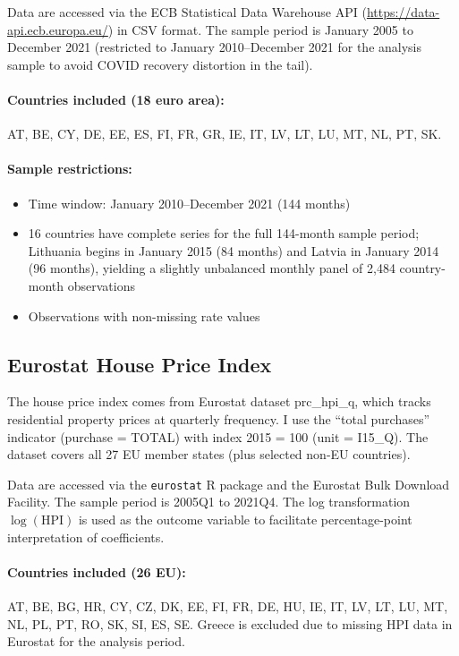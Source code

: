 \documentclass[12pt]{article}
\begin{document}
Data are accessed via the ECB Statistical Data Warehouse API (\url{https://data-api.ecb.europa.eu/}) in CSV format. The sample period is January 2005 to December 2021 (restricted to January 2010--December 2021 for the analysis sample to avoid COVID recovery distortion in the tail).

\paragraph{Countries included (18 euro area):} AT, BE, CY, DE, EE, ES, FI, FR, GR, IE, IT, LV, LT, LU, MT, NL, PT, SK.

\paragraph{Sample restrictions:}
\begin{itemize}
\item Time window: January 2010--December 2021 (144 months)
\item 16 countries have complete series for the full 144-month sample period; Lithuania begins in January 2015 (84 months) and Latvia in January 2014 (96 months), yielding a slightly unbalanced monthly panel of 2,484 country-month observations
\item Observations with non-missing rate values
\end{itemize}

\subsection{Eurostat House Price Index}

The house price index comes from Eurostat dataset prc\_hpi\_q, which tracks residential property prices at quarterly frequency. I use the ``total purchases'' indicator (purchase = TOTAL) with index 2015 = 100 (unit = I15\_Q). The dataset covers all 27 EU member states (plus selected non-EU countries).

Data are accessed via the \texttt{eurostat} R package and the Eurostat Bulk Download Facility. The sample period is 2005Q1 to 2021Q4. The log transformation $\log(\text{HPI})$ is used as the outcome variable to facilitate percentage-point interpretation of coefficients.

\paragraph{Countries included (26 EU):} AT, BE, BG, HR, CY, CZ, DK, EE, FI, FR, DE, HU, IE, IT, LV, LT, LU, MT, NL, PL, PT, RO, SK, SI, ES, SE. Greece is excluded due to missing HPI data in Eurostat for the analysis period.
\end{document}
